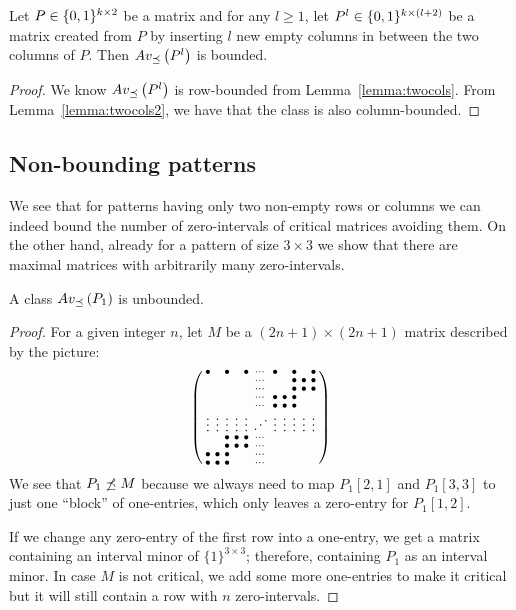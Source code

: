 \begin{cor}
\label{cor:twocols}
Let $P\in\{0,1\}^{k\times2}$ be a matrix and for any $l\geq1$, let $P^l\in\{0,1\}^{k\times(l+2)}$ be a matrix created from $P$ by inserting $l$ new empty columns in between the two columns of $P$. Then $Av_{\preceq}\left(P^l\right)$ is bounded.
\end{cor}
\begin{proof}
We know $Av_{\preceq}\left(P^l\right)$ is row-bounded from Lemma~\ref{lemma:twocols}. From Lemma~\ref{lemma:twocols2}, we have that the class is also column-bounded.
\end{proof}

\subsection{Non-bounding patterns}
\label{subsec:nonbound}
We see that for patterns having only two non-empty rows or columns we can indeed bound the number of zero-intervals of critical matrices avoiding them. On the other hand, already for a pattern of size $3\times3$ we show that there are maximal matrices with arbitrarily many zero-intervals.

\begin{lemma}
\label{lemma:manyints}
A class $Av_{\preceq}\left(P_1\right)$ is unbounded.
\end{lemma}
\begin{proof} For a given integer $n$, let $M$ be a $(2n+1)\times(2n+1)$ matrix described by the picture:
$$\smm{	\bullet& &\bullet& &\bullet&\cdots&\bullet& &\bullet& &\bullet\\
		 & & & & &\cdots& & &\bullet&\bullet&\bullet\\
		 & & & & &\cdots& & &\bullet&\bullet&\bullet\\
		 & & & & &\cdots&\bullet&\bullet&\bullet& & \\
		 & & & & &\cdots&\bullet&\bullet&\bullet& & \\
		\vdots&\vdots&\vdots&\vdots&\vdots&\Ddots&\vdots&\vdots&\vdots&\vdots&\vdots\\
		 & &\bullet&\bullet&\bullet&\cdots& & & & & \\
		 & &\bullet&\bullet&\bullet&\cdots& & & & & \\
		\bullet&\bullet&\bullet& & &\cdots& & & & & \\
		\bullet&\bullet&\bullet& & &\cdots& & & & & \\
		 }$$
We see that $P_1\not\preceq M$ because we always need to map $P_1[2,1]$ and $P_1[3,3]$ to just one ``block'' of one-entries, which only leaves a zero-entry for $P_1[1,2]$.

If we change any zero-entry of the first row into a one-entry, we get a matrix containing an interval minor of $\{1\}^{3\times3}$; therefore, containing $P_1$ as an interval minor. In case $M$ is not critical, we add some more one-entries to make it critical but it will still contain a row with $n$ zero-intervals.
\end{proof}

